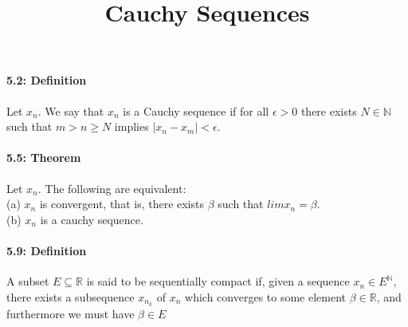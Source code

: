 \documentclass[10pt,letter]{article}
\begin{document}
\title{Cauchy Sequences}
\paragraph{5.2: Definition}
Let $x_n$. We say that $x_n$ is a Cauchy sequence if for all $\epsilon > 0$ there exists $N\in\mathbb{N}$ such that $m > n \geq N$ implies $|x_n - x_m| < \epsilon$. 

\paragraph{5.5: Theorem}
Let $x_n$. The following are equivalent: \\ 
(a) $x_n$ is convergent, that is, there exists $\beta$ such that $lim x_n = \beta$.\\ 
(b) $x_n$ is a cauchy sequence. 

\paragraph{5.9: Definition}
A subset $E \subseteq \mathbb{R}$ is said to be sequentially compact if, given a sequence $x_n \in E^\mathbb{N}$, there exists a subsequence $x_n_k$ of $x_n$ which converges to some element $\beta \in \mathbb{R}$, and furthermore we must have $\beta \in E$
\end{document}
